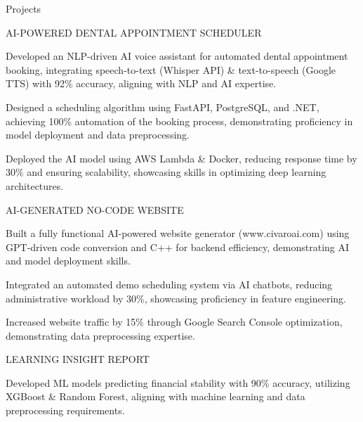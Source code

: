 \documentclass{resume} %
\begin{document}
    \begin{rSection}{Projects}
                    \begin{rSubsection}
                                    {AI{-}POWERED DENTAL APPOINTMENT SCHEDULER}
                                {}{}{}
                                    \item Developed an NLP{-}driven AI voice assistant for automated dental appointment booking, integrating speech{-}to{-}text (Whisper API) \& text{-}to{-}speech (Google TTS) with 92\% accuracy, aligning with NLP and AI expertise.
                                    \item Designed a scheduling algorithm using FastAPI, PostgreSQL, and .NET, achieving 100\% automation of the booking process, demonstrating proficiency in model deployment and data preprocessing.
                                    \item Deployed the AI model using AWS Lambda \& Docker, reducing response time by 30\% and ensuring scalability, showcasing skills in optimizing deep learning architectures.
                            \end{rSubsection}
                    \begin{rSubsection}
                                    {AI{-}GENERATED NO{-}CODE WEBSITE}
                                {}{}{}
                                    \item Built a fully functional AI{-}powered website generator (www.civaroai.com) using GPT{-}driven code conversion and C++ for backend efficiency, demonstrating AI and model deployment skills.
                                    \item Integrated an automated demo scheduling system via AI chatbots, reducing administrative workload by 30\%, showcasing proficiency in feature engineering.
                                    \item Increased website traffic by 15\% through Google Search Console optimization, demonstrating data preprocessing expertise.
                            \end{rSubsection}
                    \begin{rSubsection}
                                    {LEARNING INSIGHT REPORT}
                                {}{}{}
                                    \item Developed ML models predicting financial stability with 90\% accuracy, utilizing XGBoost \& Random Forest, aligning with machine learning and data preprocessing requirements.

\end{rSubsection}
\end{rSection}
\end{document}
